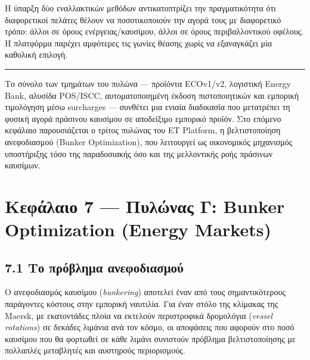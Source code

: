 Η ύπαρξη δύο εναλλακτικών μεθόδων αντικατοπτρίζει την πραγματικότητα ότι
διαφορετικοί πελάτες θέλουν να ποσοτικοποιούν την αγορά τους με
διαφορετικό τρόπο: άλλοι σε όρους ενέργειας/καυσίμου, άλλοι σε όρους
περιβαλλοντικού οφέλους. Η πλατφόρμα παρέχει αμφότερες τις γωνίες θέασης
χωρίς να εξαναγκάζει μία καθολική επιλογή.

\begin{center}\rule{0.5\linewidth}{0.5pt}\end{center}

Το σύνολο των τμημάτων του πυλώνα --- προϊόντα ECOv1/v2, λογιστική
Energy Bank, αλυσίδα POS/ISCC, αυτοματοποιημένη έκδοση πιστοποιητικών
και εμπορική τιμολόγηση μέσω surcharges --- συνθέτει μια ενιαία
διαδικασία που μετατρέπει τη φυσική αγορά πράσινου καυσίμου σε
αποδείξιμο εμπορικό προϊόν. Στο επόμενο κεφάλαιο παρουσιάζεται ο τρίτος
πυλώνας του ET Platform, η βελτιστοποίηση ανεφοδιασμού (Bunker
Optimization), που λειτουργεί ως οικονομικός μηχανισμός υποστήριξης τόσο
της παραδοσιακής όσο και της μελλοντικής ροής πράσινων καυσίμων.

\pagebreak

\chapter{Κεφάλαιο 7 --- Πυλώνας Γ: Bunker Optimization (Energy
Markets)}\label{ux3baux3b5ux3c6ux3acux3bbux3b1ux3b9ux3bf-7-ux3c0ux3c5ux3bbux3ceux3bdux3b1ux3c2-ux3b3-bunker-optimization-energy-markets}

\section{7.1 Το πρόβλημα
ανεφοδιασμού}\label{ux3c4ux3bf-ux3c0ux3c1ux3ccux3b2ux3bbux3b7ux3bcux3b1-ux3b1ux3bdux3b5ux3c6ux3bfux3b4ux3b9ux3b1ux3c3ux3bcux3bfux3cd}

Ο ανεφοδιασμός καυσίμου (\emph{bunkering}) αποτελεί έναν από τους
σημαντικότερους παράγοντες κόστους στην εμπορική ναυτιλία. Για έναν
στόλο της κλίμακας της Maersk, με εκατοντάδες πλοία να εκτελούν
περιστροφικά δρομολόγια (\emph{vessel rotations}) σε δεκάδες λιμάνια ανά
τον κόσμο, οι αποφάσεις που αφορούν στο ποσό καυσίμου που θα φορτωθεί σε
κάθε λιμάνι συνιστούν πρόβλημα βελτιστοποίησης με πολλαπλές μεταβλητές
και αυστηρούς περιορισμούς.

